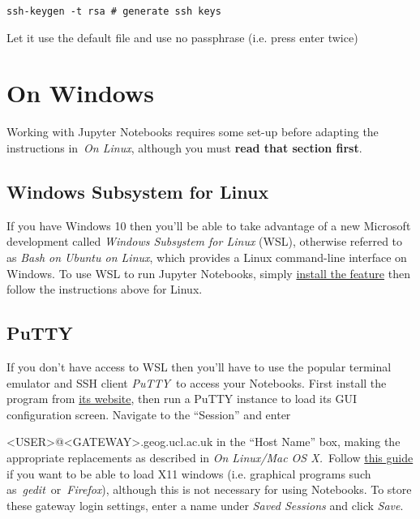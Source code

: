\documentclass[10pt,a4]{article}
\begin{document}
\begin{lstlisting}
ssh-keygen -t rsa # generate ssh keys
\end{lstlisting}

Let it use the default file and use no passphrase (i.e. press enter
twice)

\section{On Windows}

\label{909619}

Working with Jupyter Notebooks requires some set-up before adapting the
instructions in~\emph{On Linux}, although you must \textbf{read that
section first}.

\subsection{Windows Subsystem for
Linux}

\label{811558}

If you have Windows 10 then you'll be able to take advantage of a new
Microsoft development called \emph{Windows Subsystem for Linux} (WSL),
otherwise referred to as \emph{Bash on Ubuntu on Linux}, which provides
a Linux command-line interface on Windows. To use WSL to run Jupyter
Notebooks, simply
\href{https://msdn.microsoft.com/en-gb/commandline/wsl/install_guide}{install
the feature} then follow the instructions above for Linux.

\subsection{PuTTY}

\label{903289}

If you don't have access to WSL then you'll have to use the popular
terminal emulator and SSH client \emph{PuTTY~}to access your Notebooks.
First install the program from
\href{http://www.chiark.greenend.org.uk/~sgtatham/putty/latest.html}{its
website}, then run a PuTTY instance to load its GUI configuration
screen. Navigate to the ``Session'' and enter

\textless{}USER\textgreater{}@\textless{}GATEWAY\textgreater{}.geog.ucl.ac.uk
in the ``Host Name'' box, making the appropriate replacements as
described in \emph{On Linux/Mac OS X.~}Follow
\href{http://www.geo.mtu.edu/geoschem/docs/putty_install.html}{this
guide} if you want to be able to load X11 windows (i.e. graphical
programs such as~\emph{gedit}~or~\emph{Firefox}), although this is not
necessary for using Notebooks. To store these gateway login settings,
enter a name under \emph{Saved Sessions} and click \emph{Save}.
\end{document}
